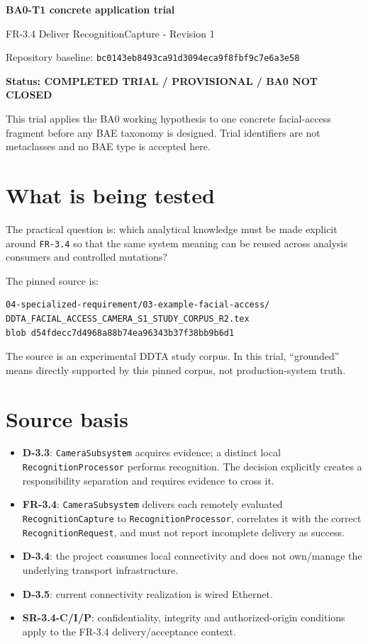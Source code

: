 \documentclass[10pt,a4paper]{article}
\newenvironment{trialbox}[1]{\def\FrameCommand{\fcolorbox{ddtaorange}{ddtagray}}\MakeFramed{\advance\hsize-2\width\FrameRestore}\noindent\textbf{#1}\par\smallskip}{\endMakeFramed}
\begin{document}
\begin{center}
{\LARGE\bfseries BA0-T1 concrete application trial}\par
{\large FR-3.4 Deliver RecognitionCapture - Revision 1}\par\smallskip
{\small Repository baseline: \texttt{bc0143eb8493ca91d3094eca9f8fbf9c7e6a3e58}}
\end{center}

\begin{trialbox}{Status: COMPLETED TRIAL / PROVISIONAL / BA0 NOT CLOSED}
This trial applies the BA0 working hypothesis to one concrete facial-access fragment before any BAE taxonomy is designed. Trial identifiers are not metaclasses and no BAE type is accepted here.
\end{trialbox}

\section{What is being tested}
The practical question is: which analytical knowledge must be made explicit around \texttt{FR-3.4} so that the same system meaning can be reused across analysis consumers and controlled mutations?

The pinned source is:
\begin{lstlisting}
04-specialized-requirement/03-example-facial-access/
DDTA_FACIAL_ACCESS_CAMERA_S1_STUDY_CORPUS_R2.tex
blob d54fdecc7d4968a88b74ea96343b37f38bb9b6d1
\end{lstlisting}

The source is an experimental DDTA study corpus. In this trial, ``grounded'' means directly supported by this pinned corpus, not production-system truth.

\section{Source basis}
\begin{itemize}
\item \textbf{D-3.3}: \texttt{CameraSubsystem} acquires evidence; a distinct local \texttt{RecognitionProcessor} performs recognition. The decision explicitly creates a responsibility separation and requires evidence to cross it.
\item \textbf{FR-3.4}: \texttt{CameraSubsystem} delivers each remotely evaluated \texttt{RecognitionCapture} to \texttt{RecognitionProcessor}, correlates it with the correct \texttt{RecognitionRequest}, and must not report incomplete delivery as success.
\item \textbf{D-3.4}: the project consumes local connectivity and does not own/manage the underlying transport infrastructure.
\item \textbf{D-3.5}: current connectivity realization is wired Ethernet.
\item \textbf{SR-3.4-C/I/P}: confidentiality, integrity and authorized-origin conditions apply to the FR-3.4 delivery/acceptance context.
\end{itemize}
\end{document}
